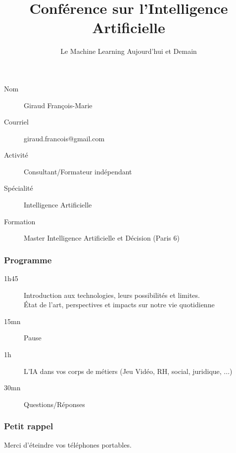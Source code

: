 \documentclass{formation}
\title{Conférence sur l'Intelligence Artificielle}
\subtitle{Le Machine Learning Aujourd'hui et Demain}
\begin{document}
\maketitle

\begin{frame}
  \begin{description}
  \item[Nom] Giraud François-Marie
  \item[Courriel] giraud.francois@gmail.com
  \item[Activité] Consultant/Formateur indépendant
  \item[Spécialité] Intelligence Artificielle
  \item[Formation] Master Intelligence Artificielle et Décision (Paris 6)
  \end{description}
\end{frame}

\begin{frame}
  \frametitle{Programme}
  \begin{description}
  \item[1h45] Introduction aux technologies, leurs possibilités et limites. \\
    État de l'art, perspectives et impacts sur notre vie quotidienne
  \item[ ]
  \item[15mn] Pause
  \item[ ]
  \item[1h] L'IA dans vos corps de métiers (Jeu Vidéo, RH, social, juridique, ...)
  \item[ ]
  \item[30mn] Questions/Réponses
  \end{description}
\end{frame}

\begin{frame}
  \frametitle{Petit rappel}
  Merci d'éteindre vos téléphones portables.
\end{frame}
\end{document}
